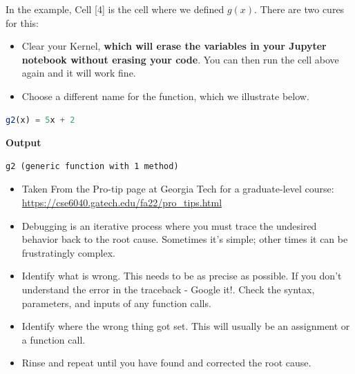 In the example, Cell [4] is the cell where we defined $g(x)$. There are two cures for this:
\begin{itemize}
    \item Clear your Kernel, \textbf{which will erase the variables in your Jupyter notebook without erasing your code}. You can then run the cell above again and it will work fine.

    \item Choose a different name for the function, which we illustrate below.
\end{itemize}
\begin{lstlisting}[language=Julia,style=mystyle]
g2(x) = 5x + 2
\end{lstlisting}
\textbf{Output} 
\begin{verbatim}
g2 (generic function with 1 method)
\end{verbatim}

\vspace*{.2cm}

\begin{tcolorbox}[title={\large \bf Debugging}]

    \begin{itemize}
        \item Taken From the Pro-tip page at Georgia Tech for a graduate-level course: \url{https://cse6040.gatech.edu/fa22/pro_tips.html}

        \item Debugging is an iterative process where you must trace the undesired behavior back to the root cause. Sometimes it's simple; other times it can be frustratingly complex.

        \item Identify what is wrong. This needs to be as precise as possible. If you don't understand the error in the traceback - Google it!. Check the syntax, parameters, and inputs of any function calls.

        \item Identify where the wrong thing got set. This will usually be an assignment or a function call.

        \item Rinse and repeat until you have found and corrected the root cause.
    \end{itemize}
\end{tcolorbox}